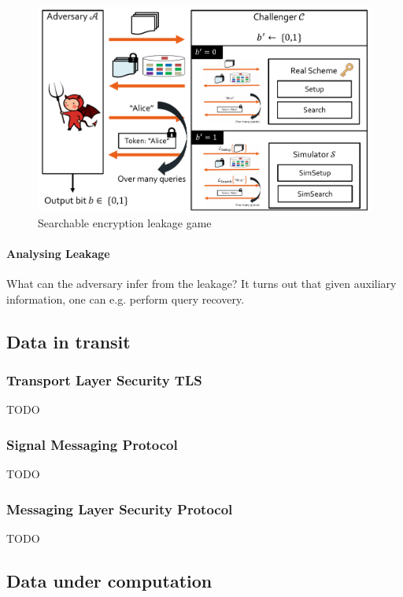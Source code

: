 \begin{figure}[h]
    \centering
	\includegraphics[scale=0.4]{images/searchable-encryption-leakage.png}
    \caption{Searchable encryption leakage game}
    \label{fig:searchable-encryption-leakage}
\end{figure}

\paragraph{Analysing Leakage}
What can the adversary infer from the leakage?
It turns out that given auxiliary information, one can e.g. perform query recovery.


\subsection{Data in transit}

\subsubsection{Transport Layer Security TLS}

TODO


\subsubsection{Signal Messaging Protocol}

TODO


\subsubsection{Messaging Layer Security Protocol}

TODO


\subsection{Data under computation}

